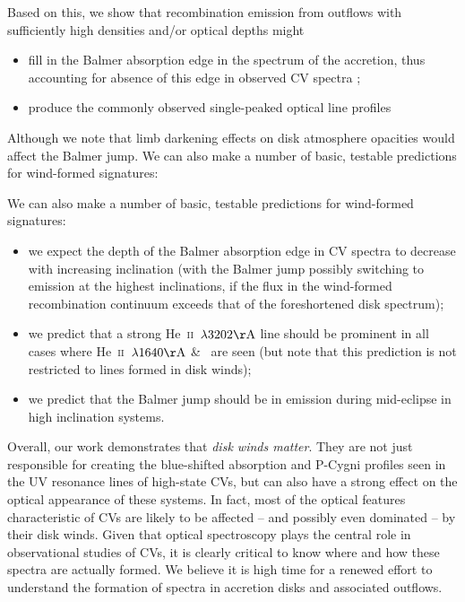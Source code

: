 \documentclass[preprint, a4paper, 11pt]{aastex}
\begin{document}
Based on this, we
show that recombination emission from outflows with sufficiently high
densities and/or optical depths might 

\renewcommand{\labelitemi}{$\bullet$}
\begin{itemize}
	\item fill in the Balmer absorption edge in the spectrum of
          the accretion, thus accounting for absence of this edge in
          observed CV spectra \citep{KLWB98};
	\item produce the commonly observed single-peaked optical line
          profiles \citep{MC96}
\end{itemize}
\smallskip

Although we note that limb darkening effects on disk atmosphere opacities
would affect the Balmer jump. We can also make a number of basic,
testable predictions for wind-formed signatures:


\noindent We can also make a number of basic,
testable predictions for wind-formed signatures:
\begin{itemize}
	\item we expect the depth of the Balmer absorption edge in CV
          spectra to decrease with increasing inclination (with the
          Balmer jump possibly switching to emission at the highest
          inclinations, if the flux in the wind-formed recombination
          continuum exceeds that of the foreshortened disk spectrum);
	\item we predict that a strong He~\textsc{ii}~$\lambda3202{\rm
          \AA}$ line should be prominent in all cases where
          He~\textsc{ii}~$\lambda1640{\rm \AA}$ \& \heiiopt\ are seen
          (but note that this prediction is not restricted to lines
          formed in disk winds);
	\item we predict that the Balmer jump should be in emission
          during mid-eclipse in high inclination systems.
\end{itemize}

\smallskip


Overall, our work demonstrates that {\sl disk winds matter}. They are
not just responsible for creating the blue-shifted absorption and
P-Cygni profiles seen in the UV resonance lines of high-state CVs, but
can also have a strong effect on the optical appearance of these
systems. In fact, most of the optical features characteristic of CVs
are likely to be affected -- and possibly even dominated -- by their disk
winds. Given that optical spectroscopy plays the central role in
observational studies of CVs, it is clearly critical to know 
where and how these spectra are actually formed. We believe it is high
time for a renewed effort to understand the formation of spectra in
accretion disks and associated outflows. 
\end{document}
